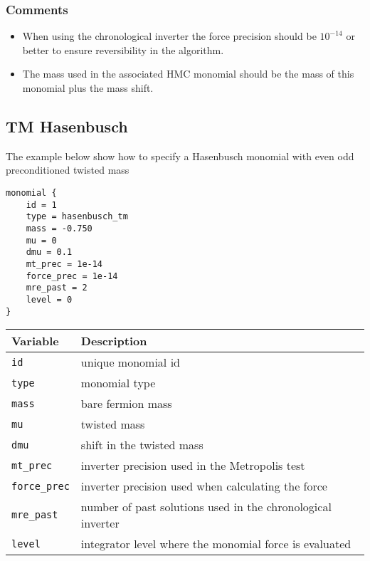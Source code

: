 \documentclass[12pt]{article}
\begin{document}
\subsubsection*{Comments}
\begin{itemize}
 \item When using the chronological inverter the force precision should be $10^{-14}$ or better to ensure reversibility in the algorithm.
 \item The mass used in the associated HMC monomial should be the mass of this monomial plus the mass shift.
\end{itemize}

\newpage
\subsection*{TM Hasenbusch}
The example below show how to specify a Hasenbusch monomial with even odd preconditioned twisted mass 
\begin{center}
\begin{minipage}{60mm}
\begin{framed}
\begin{verbatim}
monomial {
    id = 1
    type = hasenbusch_tm
    mass = -0.750
    mu = 0
    dmu = 0.1
    mt_prec = 1e-14
    force_prec = 1e-14
    mre_past = 2
    level = 0
}

\end{verbatim}
\vspace{-5mm}
\end{framed}
\end{minipage}
\end{center}

\vspace{2mm}

\begin{center}
\begin{tabular}{l|l}
 Variable & Description \\
 \hline
 \verb|id|         & unique monomial id \\
 \verb|type|       & monomial type \\
 \verb|mass|       & bare fermion mass \\
 \verb|mu|         & twisted mass \\
 \verb|dmu|        & shift in the twisted mass \\
 \verb|mt_prec|    & inverter precision used in the Metropolis test \\
 \verb|force_prec| & inverter precision used when calculating the force \\
 \verb|mre_past|   & number of past solutions used in the chronological inverter \\
 \verb|level|      & integrator level where the monomial force is evaluated
\end{tabular}
\end{center}
\end{document}
